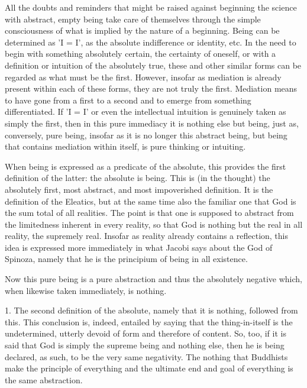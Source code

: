     All the doubts and reminders that might be raised against
    beginning the science with abstract, empty being
    take care of themselves through the simple consciousness of
    what is implied by the nature of a beginning.
    Being can be determined as 'I = I',
    as the absolute indifference or identity, etc.
    In the need to begin with something absolutely certain,
    the certainty of oneself, or with a definition or
    intuition of the absolutely true,
    these and other similar forms can be
    regarded as what must be the first.
    However, insofar as mediation is
    already present within each of these forms,
    they are not truly the first.
    Mediation means to have gone from a first to a second
    and to emerge from something differentiated.
    If 'I = I' or even the intellectual intuition is
    genuinely taken as simply the first,
    then in this pure immediacy
    it is nothing else but being, just as,
    conversely, pure being, insofar as it is
    no longer this abstract being,
    but being that contains mediation within itself,
    is pure thinking or intuiting.

    When being is expressed as a predicate of the absolute,
    this provides the first definition of the latter:
    the absolute is being.
    This is (in the thought) the absolutely first,
    most abstract, and most impoverished definition.
    It is the definition of the Eleatics,
    but at the same time also the familiar one
    that God is the sum total of all realities.
    The point is that one is supposed to abstract
    from the limitedness inherent in every reality,
    so that God is nothing but the real in all reality,
    the supremely real.
    Insofar as reality already contains a reflection,
    this idea is expressed more immediately in what
    Jacobi says about the God of Spinoza, namely
    that he is the principium of being in all existence.

Now this pure being is a pure abstraction and
thus the absolutely negative which,
when likewise taken immediately, is nothing.

    1. The second definition of the absolute,
    namely that it is nothing, followed from this.
    This conclusion is, indeed, entailed by saying
    that the thing-in-itself is the undetermined,
    utterly devoid of form and therefore of content.
    So, too, if it is said that God is simply
    the supreme being and nothing else, then he is being declared,
    as such, to be the very same negativity.
    The nothing that Buddhists make the principle of everything and
    the ultimate end and goal of everything is the same abstraction.

